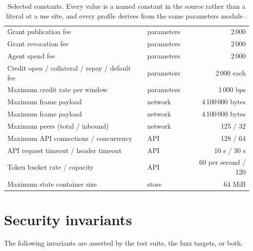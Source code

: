 \documentclass{article}
\begin{document}
\begin{table}[t]
\begin{tabular}{llr}
Grant publication fee & parameters & 2\,000 \\
Grant revocation fee & parameters & 2\,000 \\
Agent spend fee & parameters & 2\,000 \\
Credit open / collateral / repay / default fee & parameters & 2\,000 each \\
Maximum credit rate per window & parameters & 1\,000 bps \\
Maximum frame payload & network & 4\,100\,000 bytes \\
Maximum frame payload & network & 4\,100\,000 bytes \\
Maximum peers (total / inbound) & network & 125 / 32 \\
Maximum API connections / concurrency & API & 128 / 64 \\
API request timeout / header timeout & API & 10 s / 30 s \\
Token bucket rate / capacity & API & 60 per second / 120 \\
Maximum state container size & store & 64 MiB \\
\bottomrule
\end{tabular}
\caption{Selected constants. Every value is a named constant in the source
rather than a literal at a use site, and every profile derives from the same
parameters module \cite{srct-spec}.}
\label{tab:constants}
\end{table}

\section{Security invariants}
\label{app:invariants}

The following invariants are asserted by the test suite, the fuzz targets, or
both.
\end{document}
